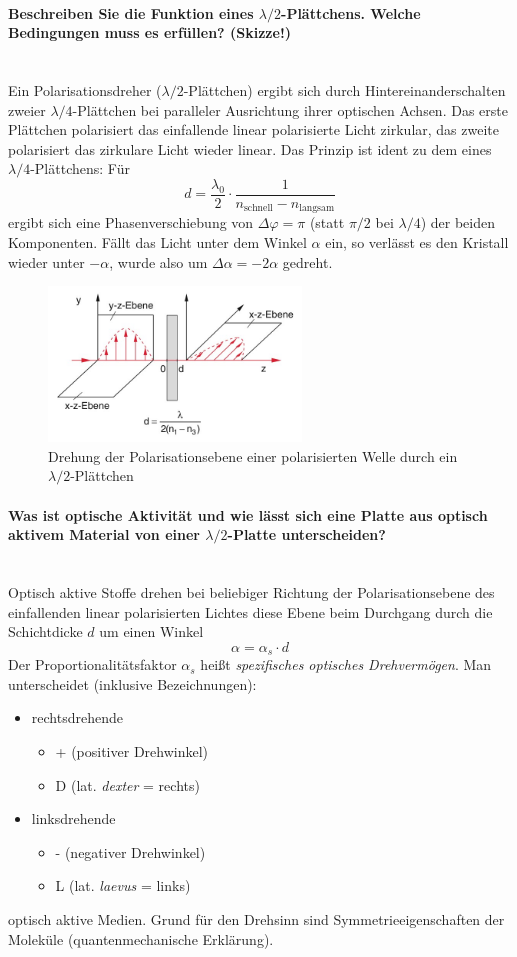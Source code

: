 \documentclass[a4paper, 11pt, ngerman, parskip=half-]{scrartcl}
\newcommand{\myparagraph}[1]{\paragraph{#1}\mbox{}\\}
\begin{document}
\myparagraph{Beschreiben Sie die Funktion eines $\lambda/2$-Plättchens. Welche Bedingungen muss es erfüllen? (Skizze!)}
%
Ein Polarisationsdreher ($\lambda/2$-Plättchen) ergibt sich durch Hintereinanderschalten zweier $\lambda/4$-Plättchen bei paralleler Ausrichtung ihrer optischen Achsen. Das erste Plättchen polarisiert das einfallende linear polarisierte Licht zirkular, das zweite polarisiert das zirkulare Licht wieder linear. Das Prinzip ist ident zu dem eines $\lambda/4$-Plättchens: Für
%
\[d = \frac{\lambda_0}{2} \cdot \frac{1}{n_{\text{schnell}} - n_{\text{langsam}}}\]
%
ergibt sich eine Phasenverschiebung von $\Delta \varphi = \pi$ (statt $\pi/2$ bei $\lambda/4$) der beiden Komponenten. Fällt das Licht unter dem Winkel $\alpha$ ein, so verlässt es den Kristall wieder unter $-\alpha$, wurde also um $\Delta \alpha = -2 \alpha$ gedreht.
%
\begin{figure}[!h]
    \centering
    \begin{samepage}
        \includegraphics[width=0.6\textwidth]{image/15/lambda_halbe.jpg}
        \caption{Drehung der Polarisationsebene einer polarisierten
            Welle durch ein $\lambda/2$-Plättchen}
        \label{fig:lambda_halbe}
    \end{samepage}
\end{figure}


\myparagraph{Was ist optische Aktivität und wie lässt sich eine Platte aus optisch aktivem Material von einer $\lambda/2$-Platte unterscheiden?}
%
Optisch aktive Stoffe drehen bei beliebiger Richtung der Polarisationsebene des einfallenden linear polarisierten Lichtes diese Ebene beim Durchgang durch die Schichtdicke $d$ um einen Winkel
%
\[\alpha = \alpha_s \cdot d\]
%
Der Proportionalitätsfaktor $\alpha_s$ heißt \textit{spezifisches optisches Drehvermögen}. Man unterscheidet (inklusive Bezeichnungen):
\begin{itemize}
    \item rechtsdrehende
          \begin{itemize}
              \item + (positiver Drehwinkel)
              \item D (lat. \textit{dexter} = rechts)
          \end{itemize}
    \item linksdrehende
          \begin{itemize}
              \item - (negativer Drehwinkel)
              \item L (lat. \textit{laevus} = links)
          \end{itemize}
\end{itemize}
optisch aktive Medien. Grund für den Drehsinn sind Symmetrieeigenschaften der Moleküle (quantenmechanische Erklärung).
\end{document}
